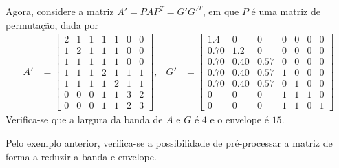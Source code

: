 \begin{exem}
    Agora, considere a matriz $A' = P A P^T = G' G'^T$, em que $P$ é uma matriz de
    permutação, dada por
    \begin{align*}
        A' &= \begin{bmatrix}
            2 & 1 & 1 & 1 & 1 & 0 & 0 \\
            1 & 2 & 1 & 1 & 1 & 0 & 0 \\
            1 & 1 & 1 & 1 & 1 & 0 & 0 \\
            1 & 1 & 1 & 2 & 1 & 1 & 1 \\
            1 & 1 & 1 & 1 & 2 & 1 & 1 \\
            0 & 0 & 0 & 1 & 1 & 3 & 2 \\
            0 & 0 & 0 & 1 & 1 & 2 & 3
        \end{bmatrix},
        & G' &= \begin{bmatrix}
             1.4 & 0 & 0 & 0 & 0 & 0 & 0 \\
            0.70 & 1.2 & 0 & 0 & 0 & 0 & 0 \\
            0.70 & 0.40 & 0.57 & 0 & 0 & 0 & 0 \\
            0.70 & 0.40 & 0.57 & 1 & 0 & 0 & 0 \\
            0.70 & 0.40 & 0.57 & 0 & 1 & 0 & 0 \\
            0 & 0 & 0 & 1 & 1 & 1 & 0 \\
            0 & 0 & 0 & 1 & 1 & 0 & 1
        \end{bmatrix}
    \end{align*}
    Verifica-se que a largura da banda de $A$ e $G$ é $4$ e o envelope é $15$.
\end{exem}

Pelo exemplo anterior, verifica-se a possibilidade de pré-processar a matriz
de forma a reduzir a banda e envelope.

% 
% 

